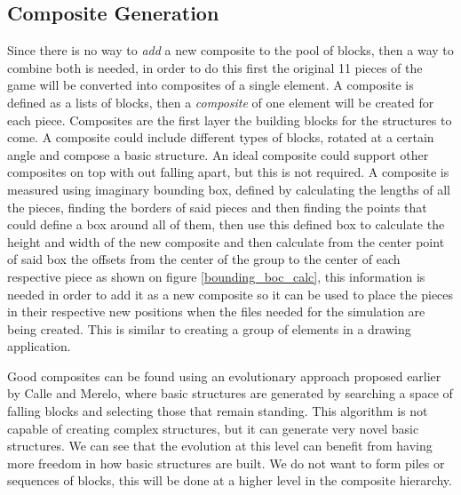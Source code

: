 \documentclass[conference]{IEEEtran}
\begin{document}
    \subsection{Composite Generation}

    Since there is no way to \textit{add} a new composite to the pool of blocks,
    then a way to combine both is needed, in order to do this first the original
    11 pieces of the game will be converted into composites of a single element.
    A composite is defined as a lists of blocks, then a \textit{composite} of
    one element will be created for each piece. Composites are the first layer
    the building blocks for the structures to come. A composite could include
    different types of blocks, rotated at a certain angle and compose a basic
    structure. An ideal composite could support other composites on top with out
    falling apart, but this is not required. A composite is measured using
    imaginary bounding box, defined by calculating the lengths of all the pieces,
    finding the borders of said pieces and then finding the points that could
    define a box around all of them, then use this defined box to calculate the
    height and width of the new composite and then calculate from the center
    point of said box the offsets from the center of the group to the center of
    each respective piece as shown on figure \ref{bounding_boc_calc}, this
    information is needed in order to add it as a new composite so it can be
    used to place the pieces in their respective new positions when the files
    needed for the simulation are being created. This is similar to creating a
    group of elements in a drawing application.

    Good composites can be found using an evolutionary approach proposed earlier 
    by Calle and Merelo, where basic structures are generated by searching a space
    of falling blocks and selecting those that remain standing. This algorithm is 
    not capable of creating complex structures, but it can generate very novel basic
    structures. We can see that the evolution at this level can benefit from having
    more freedom in how basic structures are built. We do not want to form piles
    or sequences of blocks, this will be done at a higher level in the composite hierarchy.
    
\end{document}

